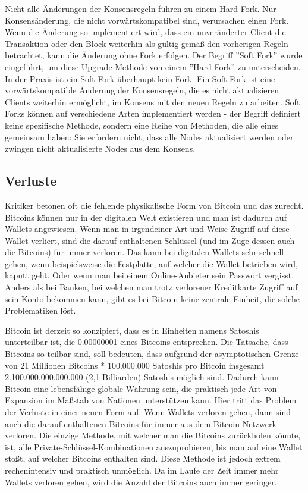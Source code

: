 Nicht alle Änderungen der Konsensregeln führen zu einem Hard Fork. Nur Konsensänderung, die nicht vorwärtskompatibel sind,
verursachen einen Fork. Wenn die Änderung so implementiert wird, dass ein unveränderter Client die Transaktion oder den
Block weiterhin als gültig gemäß den vorherigen Regeln betrachtet, kann die Änderung ohne Fork erfolgen. Der Begriff
''Soft Fork'' wurde eingeführt, um diese Upgrade-Methode von einem ''Hard Fork'' zu unterscheiden. In der Praxis ist ein Soft
Fork überhaupt kein Fork. Ein Soft Fork ist eine vorwärtskompatible Änderung der Konsensregeln, die es nicht aktualisieren
Clients weiterhin ermöglicht, im Konsens mit den neuen Regeln zu arbeiten. Soft Forks können auf verschiedene Arten implementiert
werden - der Begriff definiert keine spezifische Methode, sondern eine Reihe von Methoden, die alle eines gemeinsam haben: Sie
erfordern nicht, dass alle Nodes aktualisiert werden oder zwingen nicht aktualisierte Nodes aus dem Konsens. 

\subsection{Verluste}
Kritiker betonen oft die fehlende physikalische Form von Bitcoin und das zurecht. Bitcoins können nur in der digitalen Welt
existieren und man ist dadurch auf Wallets angewiesen. Wenn man in irgendeiner Art und Weise Zugriff auf diese Wallet verliert,
sind die darauf enthaltenen Schlüssel (und im Zuge dessen auch die Bitcoins) für immer verloren. Das kann bei digitalen Wallets 
sehr schnell gehen, wenn beispielsweise
die Festplatte, auf welcher die Wallet betrieben wird, kaputt geht. Oder wenn man bei einem Online-Anbieter sein Passwort
vergisst. Anders als bei Banken, bei welchen man trotz verlorener Kreditkarte Zugriff auf sein Konto bekommen kann, gibt es 
bei Bitcoin keine zentrale Einheit, die solche Problematiken löst.

Bitcoin ist derzeit so konzipiert, dass es in Einheiten namens Satoshis unterteilbar ist, die 0.00000001 eines Bitcoins
entsprechen. Die Tatsache, dass Bitcoins so teilbar sind, soll bedeuten, dass aufgrund der asymptotischen Grenze von 21
Millionen Bitcoins * 100.000.000 Satoshis pro Bitcoin insgesamt 2.100.000.000.000.000 (2,1 Billiarden) Satoshis möglich sind.
Dadurch kann Bitcoin eine lebensfähige globale Währung sein, die praktisch jede Art von Expansion im Maßstab von Nationen 
unterstützen kann. 
Hier tritt das Problem der Verluste in einer neuen Form auf: Wenn Wallets verloren gehen, dann sind auch die 
darauf enthaltenen Bitcoins für immer aus dem Bitcoin-Netzwerk verloren. Die einzige Methode, mit welcher man die Bitcoins
zurückholen könnte, ist, alle Private-Schlüssel-Kombinationen auszuprobieren, bis man auf eine Wallet stoßt, auf welcher Bitcoins
enthalten sind. Diese Methode ist jedoch extrem rechenintensiv und praktisch unmöglich. Da im Laufe der Zeit immer mehr Wallets
verloren gehen, wird die Anzahl der Bitcoins auch immer geringer.